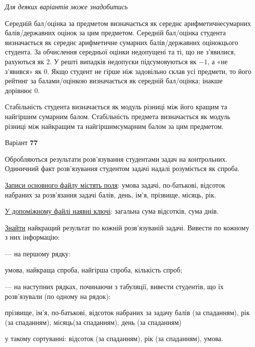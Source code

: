 \documentclass[11pt, ukrainian]{article}
\begin{document}
\bigskip\textit{Для деяких варіантів може знадобитись}

Середній бал/оцінка за предметом визначається як середнє арифметичнесумарних балів/державних оцінок за цим предметом. 
Середній бал/оцінка студента визначається як середнє арифметичне сумарних балів/державних оцінокцього студента. 
За обчислення середньої оцінки недопущені та ті, що не з’явилися, рахуються як 2.
У решті випадків недопуски підсумовуються як $-1$, а «не з’явився» як 0.
Якщо студент не гірше ніж задовільно склав усі предмети, 
то його рейтинг за балами/оцінкою визначається як середній бал/оцінка; інакше дорівнює 0.

Стабільність студента визначається як модуль різниці між його кращим та найгіршим сумарним балом.
Стабільність предмета визначається як модуль різниці між найкращим та найгіршимсумарним балом за цим предметом.






\par
\newpage
{\center Варіант  \No \textbf { 77 }\par}
\bigskip
Обробляються результати розв’язування студентами задач на контрольних.
Одиничний факт роз\-в’я\-зу\-вання студентом задачі надалі розуміється як спроба.

\underline{Записи основного файлу містять поля}: умова задачі, по-батькові, відсоток набраних за розв’язання задачі балів, день, ім’я, прізвище, місяць, рік.

\underline{У допоміжному файлі наявні ключі}: загальна сума відсотків, сума днів.

\underline{Знайти} найкращий результат по кожній розв'язуваній задачі. Вивести по кожному з них інформацію:\par
{\noindent}--- на першому рядку:\par
умова, найкраща спроба, найгірша спроба, кількість спроб;

{\noindent}--- на наступних рядках, починаючи з табуляції, вивести студентів, що їх розв'язували (по одному на рядок):\par
прізвище, ім’я, по-батькові, відсоток набраних за задачу балів (за спаданням), рік (за спаданням), місяць(за спаданням), день (за спаданням)

{\noindent}у такому сортуванні: відсоток (за спаданням), рік (за спаданням), умова.

\end{document}
